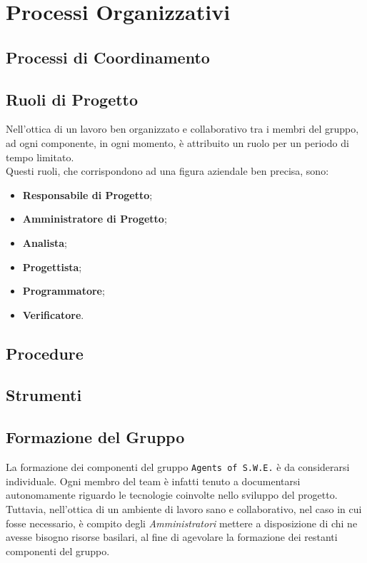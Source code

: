 \section{Processi Organizzativi}

\subsection{Processi di Coordinamento}


\subsection{Ruoli di Progetto}
	Nell'ottica di un lavoro ben organizzato e collaborativo tra i membri del gruppo, ad ogni componente, in ogni 					momento, è attribuito un ruolo per un periodo di tempo limitato.\\
	Questi ruoli, che corrispondono ad una figura aziendale ben precisa, sono:
	\begin{itemize}
	\item \textbf{Responsabile di Progetto};
	\item \textbf{Amministratore di Progetto};
	\item \textbf{Analista};
	\item \textbf{Progettista};
	\item \textbf{Programmatore};
	\item \textbf{Verificatore}.
	\end{itemize}
	

\subsection{Procedure}


\subsection{Strumenti}


\subsection{Formazione del Gruppo}
	La formazione dei componenti del gruppo \texttt{Agents of S.W.E.} è da considerarsi individuale. Ogni membro del 			team è infatti tenuto a documentarsi autonomamente riguardo le tecnologie coinvolte nello sviluppo del progetto. 			Tuttavia, nell'ottica di un ambiente di lavoro sano e collaborativo, nel caso in cui fosse necessario, è compito 			degli \textit{Amministratori} mettere a disposizione di chi ne avesse bisogno risorse basilari, al fine di 						agevolare la formazione dei restanti componenti del gruppo.

